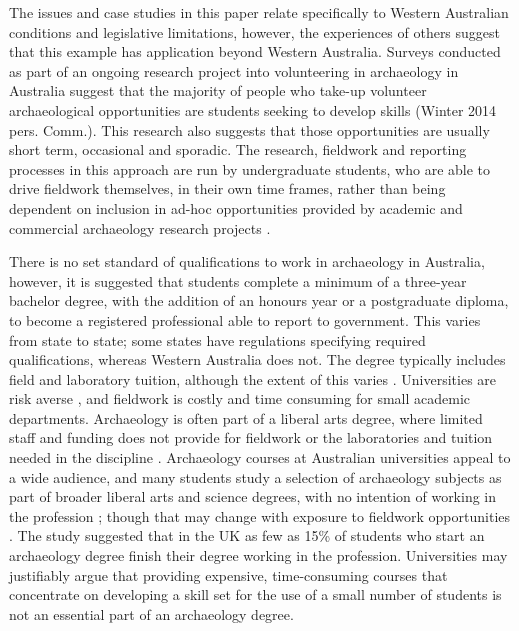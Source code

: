 \documentclass[%
]{ijsra}
\begin{document}
	The issues and case studies in this paper relate specifically to Western Australian conditions and legislative limitations, however, the experiences of others \parencites[e.g.][]{boytner2012}{mytum2012a}{mytum2012b}{scarlett2012} suggest that this example has application beyond Western Australia.
	Surveys conducted as part of an ongoing research project into volunteering in archaeology in Australia suggest that the majority of people who take-up volunteer archaeological opportunities are students seeking to develop skills (Winter 2014 pers. Comm.).
	This research also suggests that those opportunities are usually short term, occasional and sporadic. 
	The research, fieldwork and reporting processes in this approach are run by undergraduate students, who are able to drive fieldwork themselves, in their own time frames, rather than being dependent on inclusion in ad-hoc opportunities provided by academic and commercial archaeology research projects \parencites[see][90]{boytner2012}[222]{clark2012}[70-72]{colley2012}. 
	
	
	There is no set standard of qualifications to work in archaeology in Australia, however, it is suggested that students complete a minimum of a three-year bachelor degree, with the addition of an honours year or a postgraduate diploma, to become a registered professional able to report to government. 
	This varies from state to state; some states have regulations specifying required qualifications, whereas Western Australia does not. 
	The degree typically includes field and laboratory tuition, although the extent of this varies \parencite{gibbs2005}. 
	Universities are risk averse \parencite[6]{boytner2012}, and fieldwork is costly and time consuming for small academic departments. 
	Archaeology is often part of a liberal arts degree, where limited staff and funding does not provide for fieldwork or the laboratories and tuition needed in the discipline \parencites{colley2004}{colley2012}{gibbs2005}{cosgrove2013}. 
	Archaeology courses at Australian universities appeal to a wide audience, and many students study a selection of archaeology subjects as part of broader liberal arts and science degrees, with no intention of working in the profession \parencites[28]{gibbs2005}[44]{cosgrove2013}; 
	though that may change with exposure to fieldwork opportunities \parencite[29]{cobb2012}. 
	The \textcite[31]{cobb2012} study suggested that in the UK as few as 15\% of students who start an archaeology degree finish their degree working in the profession. 
	Universities may justifiably argue that providing expensive, time-consuming courses that concentrate on developing a skill set for the use of a small number of students is not an essential part of an archaeology degree.
	
\end{document}
